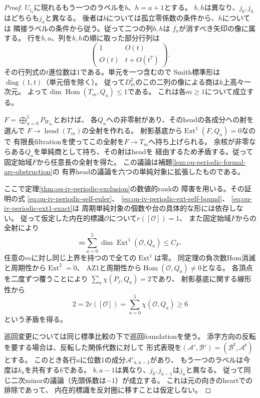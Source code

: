 \begin{proof}
$U_{i_a}$に現れるもう一つのラベルを$b$、$h=a+1$とする。
$b,h$は異なり、$j_b,j_h$はどちらも$j_a$と異なる。
後者は$b$については孤立零係数の条件から、$h$については
隣接ラベルの条件から従う。従って二つの列$b,h$は
$f_a$が消すべき矢印の像に属する。
行を$b,a$、列を$b,h$の順に取った部分行列は
\[
 \begin{pmatrix}1&O(t)\\O(t)&t+O(t^7)\end{pmatrix}.
\]
その行列式の$t$進位数は1である。単元を一つ含むので
Smith標準形は$\operatorname{diag}(1,t)$（単元倍を除く）。
従って$D_m^2$のこの二列の像による商は$k$上高々一次元。
よって$\dim\operatorname{Hom}(T_m,Q_a)\leq1$である。
これは各$m\geq1$について成立する。

$F=\bigoplus_{a=0}^5P_{W_{k_a}}$とおけば、
各$Q_a$への非零射があり、そのheadの各成分への射を選んで
$F\to\operatorname{head}(T_m)$の全射を作れる。
射影基底から$\operatorname{Ext}^1(F,Q_a)=0$なので
有限長filtrationを使ってこの全射を$F\to T_m$へ持ち上げられる。
余核が非零ならある$Q_a$を単純商として持ち、その射はheadを
経由するため矛盾する。従って固定始域$F$から任意長の全射を得た。
この議論は補題\ref{lem:ou-periodic-formal-arc-obstruction}の
有界headの議論を六つの単純対象に拡張したものである。

ここで定理\ref{thm:ou-iv-periodic-exclusion}の数値的rankの
障害を用いる。その証明の式
\eqref{eq:ou-iv-periodic-self-euler}、
\eqref{eq:ou-iv-periodic-ext-self-bound}、
\eqref{eq:ou-iv-periodic-ext1-exact}は
周期単純対象の個数や台の具体的な形には依存しない。
従って仮定した内在的標識$\mathcal O$について$r([\mathcal O])=1$、
また固定始域$F$からの全射により
\[
 m\sum_{a=0}^5\dim\operatorname{Ext}^1(\mathcal O,Q_a)\leq C_F .
\]
任意の$m$に対し同じ上界を持つので全ての$\operatorname{Ext}^1$は零。
同定理の負次数Hom消滅と周期性から$\operatorname{Ext}^2=0$、
AZ1と周期性から$\operatorname{Hom}(\mathcal O,Q_a)\ne0$となる。
各頂点を二度ずつ覆うことにより
$\sum_a\chi(P_j,Q_a)=2$であり、
射影基底に関する線形性から
\[
 2=2r([\mathcal O])=\sum_{a=0}^5\chi(\mathcal O,Q_a)\geq6
\]
という矛盾を得る。

巡回変更については同じ標準比較の下で巡回foundationを使う。
添字方向の反転を要する場合は、反転した関係代数に対して
形式表現を$(\mathcal A',\mathcal B')=
(\mathcal B^{\mathsf t},\mathcal A^{\mathsf t})$とする。
このとき各行$a$に位数1の成分$\mathcal A'_{a,a-1}$があり、
もう一つのラベルは今度は$k_a$を共有する$b$である。
$b,a-1$は異なり、$j_b,j_{a-1}$は$j_a$と異なる。
従って同じ二次minorの議論（先頭係数は$-1$）が成立する。
これは元の向きのheartでの排除であって、
内在的標識を反対圏に移すことは仮定しない。
\end{proof}

